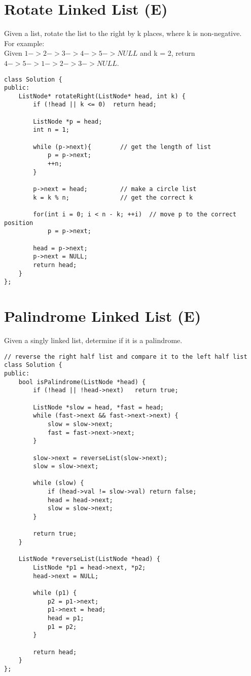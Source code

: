 \section{Rotate Linked List (E)}
Given a list, rotate the list to the right by k places, where k is non-negative.\\

For example:\\
Given $1->2->3->4->5->NULL$ and k = 2, return $4->5->1->2->3->NULL$.\\

\begin{lstlisting}
class Solution {
public:
    ListNode* rotateRight(ListNode* head, int k) {
        if (!head || k <= 0)  return head;
        
        ListNode *p = head;
        int n = 1;
        
        while (p->next){        // get the length of list
            p = p->next;
            ++n;
        }
        
        p->next = head;         // make a circle list
        k = k % n;              // get the correct k
        
        for(int i = 0; i < n - k; ++i)  // move p to the correct position
            p = p->next;
            
        head = p->next;
        p->next = NULL;
        return head;
    }
};
\end{lstlisting}


\section{Palindrome Linked List (E)}
Given a singly linked list, determine if it is a palindrome. \\

\begin{lstlisting}
// reverse the right half list and compare it to the left half list
class Solution {
public:
    bool isPalindrome(ListNode *head) {
        if (!head || !head->next)   return true;
        
        ListNode *slow = head, *fast = head;
        while (fast->next && fast->next->next) {
            slow = slow->next;
            fast = fast->next->next;
        }
        
        slow->next = reverseList(slow->next);
        slow = slow->next;
        
        while (slow) {
            if (head->val != slow->val) return false;
            head = head->next;
            slow = slow->next;
        }
        
        return true;
    }
    
    ListNode *reverseList(ListNode *head) {
        ListNode *p1 = head->next, *p2;
        head->next = NULL;
        
        while (p1) {
            p2 = p1->next;
            p1->next = head;
            head = p1;
            p1 = p2;
        }
        
        return head;
    }
};
\end{lstlisting} 



